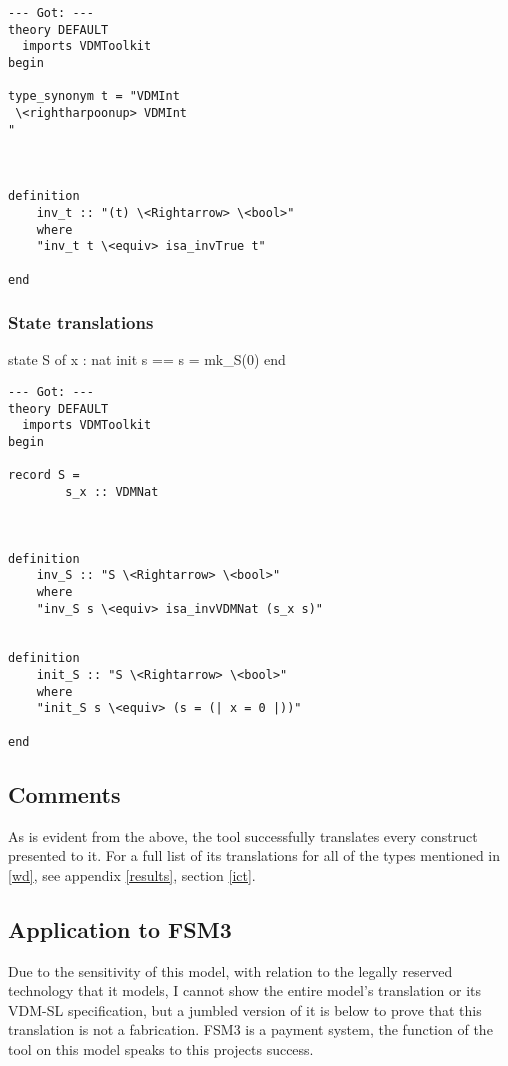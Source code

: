 \begin{lstlisting}[language=Isabelle]
--- Got: ---
theory DEFAULT
  imports VDMToolkit
begin

type_synonym t = "VDMInt
 \<rightharpoonup> VDMInt
"



definition
	inv_t :: "(t) \<Rightarrow> \<bool>"
    where
    "inv_t t \<equiv> isa_invTrue t"

end
\end{lstlisting}

\subsubsection{State translations}
\begin{vdmsl}
state S of
  x : nat
  init s == s = mk_S(0)
end
\end{vdmsl}

\begin{lstlisting}[language=Isabelle]
 --- Got: ---
theory DEFAULT
  imports VDMToolkit
begin

record S =
        s_x :: VDMNat

    

definition
	inv_S :: "S \<Rightarrow> \<bool>"
    where
    "inv_S s \<equiv> isa_invVDMNat (s_x s)"


definition
	init_S :: "S \<Rightarrow> \<bool>"
    where
    "init_S s \<equiv> (s = (| x = 0 |))"

end
\end{lstlisting}

\subsection{Comments}
As is evident from the above, the tool successfully translates every construct presented to it. For a full list of its translations for all of the types mentioned in \ref{wd}, see appendix \ref{results}, section \ref{ict}.

\subsection{Application to FSM3}
Due to the sensitivity of this model, with relation to the legally reserved technology that it models, I cannot show the entire model's translation or its VDM-SL specification, but a jumbled version of it is below to prove that this translation is not a fabrication. FSM3 is a payment system, the function of the tool on this model speaks to this projects success.



